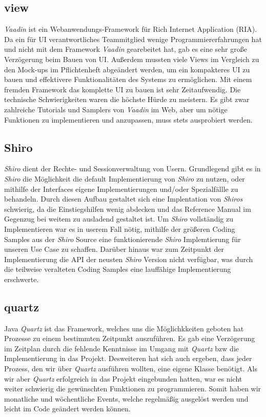 \subsection{view} 
\emph{Vaadin} ist ein Webanwendungs-Framework für Rich Internet Application (RIA). Da ein für UI verantwortliches Teammitglied wenige  Programmiererfahrungen hat und nicht mit dem Framework \emph{Vaadin} gearebeitet hat, gab es eine sehr große Verzögerung beim Bauen von UI. Außerdem mussten viele Views im Vergleich zu den Mock-ups im Pflichtenheft abgeändert werden, um ein kompakteres UI zu bauen und effektivere Funktionalitäten des Systems zu ermöglichen. Mit einem fremden Framework das komplette UI zu bauen ist sehr Zeitaufwendig. Die technische Schwierigkeiten waren die höchste Hürde zu meistern. Es gibt zwar zahlreiche Tutorials und Samplers von \emph{Vaadin} im Web, aber um nötige Funktionen zu implementieren und anzupassen, muss stets ausprobiert werden. 

\subsection{Shiro}
\emph{Shiro} dient der Rechte- und Sessionverwaltung von Usern.
Grundlegend gibt es in \emph{Shiro} die Möglichkeit die default Implementierung von \emph{Shiro} zu nutzen, oder mithilfe der Interfaces
eigene Implementierungen und/oder Spezialfällle zu behandeln.
Durch diesen Aufbau gestaltet sich eine Implentation von \emph{Shiros} schwierig, da die Einstiegshilfen wenig abdecken und das Reference Manual
im Gegenzug bei weitem zu ausladend gestaltet ist. Um \emph{Shiro} vollständig zu Implementieren war es in userem Fall nötig, mithilfe der
größeren Coding Samples aus der \emph{Shiro} Source eine funktionierende \emph{Shiro} Implemtierung für unseren Use Case zu schaffen.
Darüber hinaus war zum Zeitpunkt der Implementierung die API der neusten \emph{Shiro} Version nicht verfügbar, was durch die teilweise veralteten Coding Samples
 eine lauffähige Implementierung erschwerte.
 
\subsection{quartz} 
Java \emph{Quartz} ist das Framework, welches uns die Möglichkkeiten geboten hat Prozesse zu einem bestimmten Zeitpunkt auszuführen. Es gab eine Verzögerung im Zeitplan durch die fehlende Kenntnisse im Umgang mit \emph{Quartz} bzw die Implementierung in das Projekt.
Desweiteren hat sich auch ergeben, dass jeder Prozess, den wir über \emph{Quartz} ausführen wollten, eine eigene Klasse benötigt. Als wir aber \emph{Quartz} erfolgreich in das Projekt eingebunden hatten, war es nicht weiter schwierig die gewünschten Funktionen zu programmieren. Somit haben wir monatliche und wöchentliche Events, welche regelmäßig ausgelöst werden und leicht im Code geändert werden können.

